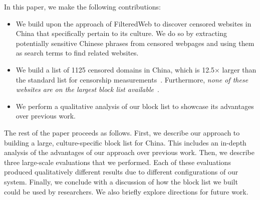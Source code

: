 In this paper, we make the following contributions:
\begin{itemize}
  \item We build upon the approach of FilteredWeb to discover censored
websites in China that specifically pertain to its culture. We do so
by extracting potentially sensitive Chinese phrases from censored
webpages and using them as search terms to find related websites.
  \item We build a list of 1125 censored domains in China, which is
12.5$\times$ larger than the standard list for censorship
measurements~\cite{citizenlab:block}. Furthermore, \textit{none of
these websites are on the largest block list
available}~\cite{darer2017filteredweb}.
  \item We perform a qualitative analysis of our block list to
    showcase its advantages over previous work.
\end{itemize}

The rest of the paper proceeds as follows. First, we describe our
approach to building a large, culture-specific block list for
China. This includes an in-depth analysis of the advantages of our
approach over previous work. Then, we describe three large-scale
evaluations that we performed. Each of these evaluations
produced qualitatively different results due to different
configurations of our system. Finally, we conclude
with a discussion of how the block list we built could be used by
researchers. We also briefly explore directions for future work.